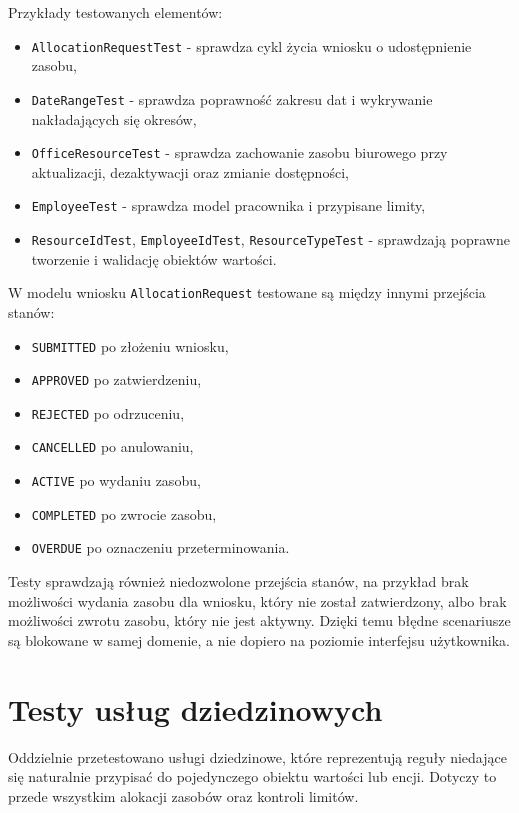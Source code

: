 Przykłady testowanych elementów:
\begin{itemize}
    \item \texttt{AllocationRequestTest} - sprawdza cykl życia wniosku o udostępnienie zasobu,
    \item \texttt{DateRangeTest} - sprawdza poprawność zakresu dat i wykrywanie nakładających się okresów,
    \item \texttt{OfficeResourceTest} - sprawdza zachowanie zasobu biurowego przy aktualizacji, dezaktywacji oraz zmianie dostępności,
    \item \texttt{EmployeeTest} - sprawdza model pracownika i przypisane limity,
    \item \texttt{ResourceIdTest}, \texttt{EmployeeIdTest}, \texttt{ResourceTypeTest} - sprawdzają poprawne tworzenie i walidację obiektów wartości.
\end{itemize}

W modelu wniosku \texttt{AllocationRequest} testowane są między innymi przejścia stanów:
\begin{itemize}
    \item \texttt{SUBMITTED} po złożeniu wniosku,
    \item \texttt{APPROVED} po zatwierdzeniu,
    \item \texttt{REJECTED} po odrzuceniu,
    \item \texttt{CANCELLED} po anulowaniu,
    \item \texttt{ACTIVE} po wydaniu zasobu,
    \item \texttt{COMPLETED} po zwrocie zasobu,
    \item \texttt{OVERDUE} po oznaczeniu przeterminowania.
\end{itemize}

Testy sprawdzają również niedozwolone przejścia stanów, na przykład brak możliwości wydania zasobu dla wniosku, który nie został zatwierdzony, albo brak możliwości zwrotu zasobu, który nie jest aktywny. Dzięki temu błędne scenariusze są blokowane w samej domenie, a nie dopiero na poziomie interfejsu użytkownika.

\section{Testy usług dziedzinowych}

Oddzielnie przetestowano usługi dziedzinowe, które reprezentują reguły niedające się naturalnie przypisać do pojedynczego obiektu wartości lub encji. Dotyczy to przede wszystkim alokacji zasobów oraz kontroli limitów.

